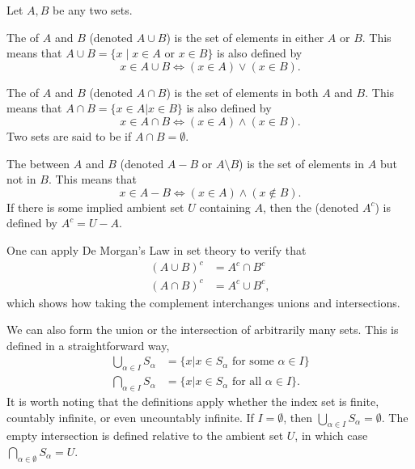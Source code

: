 Let $A,B$ be any two sets.
\begin{definition}
The  of $A$ and $B$ (denoted $A\cup B$) is the set of elements in either $A$ or $B$.
This means that $A \cup B = \{ x \mid x\in A \textrm{ or } x\in B \}$ is also defined by
\[ x\in A\cup B \Leftrightarrow (x\in A)\vee (x\in B). \]
\end{definition}

\begin{definition}
The  of $A$ and $B$ (denoted $A\cap B$) is the set of elements in both $A$ and $B$.
This means that $A\cap B = \{x\in A | x\in B \}$ is also defined by
\[ x\in A\cap B \Leftrightarrow (x\in A)\wedge (x\in B). \]
Two sets are said to be  if $A\cap B = \emptyset$.
\end{definition}

\begin{definition}
The  between $A$ and $B$ (denoted $A-B$ or $A \setminus \!B$) is the set of elements in $A$ but not in $B$.
This means that
\[ x\in A-B \Leftrightarrow (x\in A)\wedge (x\notin B). \]
If there is some implied ambient set $U$ containing $A$, then the  (denoted $A^c$) is defined by $A^c = U-A$.

\end{definition}

One can apply De Morgan's Law in set theory to verify that
\begin{align*}
(A \cup B)^c & = A^c \cap B^c \\
(A \cap B)^c & = A^c \cup B^c,
\end{align*}
which shows how taking the complement interchanges unions and intersections.

We can also form the union or the intersection of arbitrarily many sets.
This is defined in a straightforward way,
\begin{align*}
\bigcup_{\alpha \in I} S_{\alpha}
&= \{ x | x \in S_{\alpha} \text{ for some } \alpha \in I \} \\
\bigcap_{\alpha \in I} S_{\alpha}
&= \{ x | x \in S_{\alpha} \text{ for all } \alpha \in I \} .
\end{align*}
It is worth noting that the definitions apply whether the index set is finite, countably infinite, or even uncountably infinite.
If $I=\emptyset$, then $\bigcup_{\alpha\in I}S_\alpha=\emptyset$.
The empty intersection is defined relative to the ambient set $U$, in which case $\bigcap_{\alpha\in\emptyset}S_\alpha=U$.

